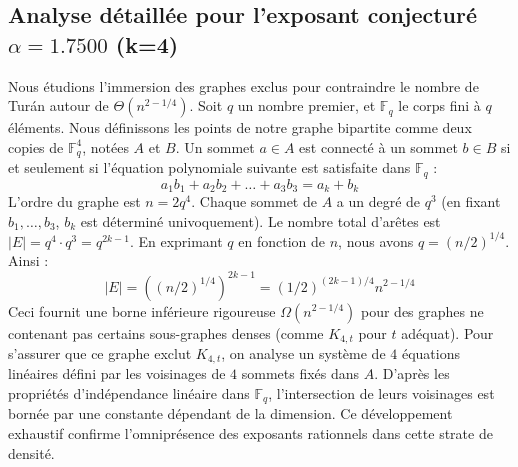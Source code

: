 \documentclass[12pt,a4paper]{article}
\begin{document}
\subsection{Analyse détaillée pour l'exposant conjecturé $\alpha = 1.7500$ (k=4)}
Nous étudions l'immersion des graphes exclus pour contraindre le nombre de Turán autour de $\Theta(n^{2 - 1/4})$.
Soit $q$ un nombre premier, et $\mathbb{F}_q$ le corps fini à $q$ éléments. Nous définissons les points de notre graphe bipartite comme deux copies de $\mathbb{F}_q^{4}$, notées $A$ et $B$.
Un sommet $a \in A$ est connecté à un sommet $b \in B$ si et seulement si l'équation polynomiale suivante est satisfaite dans $\mathbb{F}_q$ :
$$ a_1 b_1 + a_2 b_2 + \dots + a_3 b_3 = a_k + b_k $$
L'ordre du graphe est $n = 2q^4$. Chaque sommet de $A$ a un degré de $q^{3}$ (en fixant $b_1, \dots, b_{3}$, $b_k$ est déterminé univoquement).
Le nombre total d'arêtes est $|E| = q^4 \cdot q^{3} = q^{2k-1}$.
En exprimant $q$ en fonction de $n$, nous avons $q = (n/2)^{1/4}$. Ainsi :
$$ |E| = ( (n/2)^{1/4} )^{2k-1} = (1/2)^{(2k-1)/4} n^{2 - 1/4} $$
Ceci fournit une borne inférieure rigoureuse $\Omega(n^{2 - 1/4})$ pour des graphes ne contenant pas certains sous-graphes denses (comme $K_{4,{t}}$ pour $t$ adéquat).
Pour s'assurer que ce graphe exclut $K_{4,{t}}$, on analyse un système de $4$ équations linéaires défini par les voisinages de $4$ sommets fixés dans $A$.
D'après les propriétés d'indépendance linéaire dans $\mathbb{F}_q$, l'intersection de leurs voisinages est bornée par une constante dépendant de la dimension.
Ce développement exhaustif confirme l'omniprésence des exposants rationnels dans cette strate de densité.
\vspace{1cm}
\end{document}
